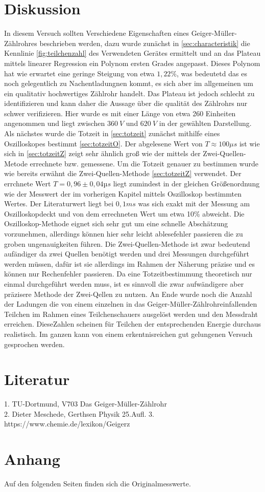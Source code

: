 \section{Diskussion}
\label{sec:diskussion}
In diesem Versuch sollten Verschiedene Eigenschaften eines Geiger-Müller-Zählrohres beschrieben werden, dazu 
wurde zunächst in \autoref{sec:characteristik} die Kennlinie \autoref{fig:teilchenzahl} 
des Verwendeten Gerätes ermittelt und an das Plateau mittels linearer Regression ein Polynom ersten Grades 
angepasst. Dieses Polynom hat wie erwartet eine geringe Steigung von etwa $1,22\%$, was bedeutetd das es noch 
gelegentlich zu Nachentladungnen kommt, es sich aber im allgemeinen um ein qualitativ hochwertiges Zählrohr handelt.
Das Plateau ist jedoch schlecht zu identifizieren und kann daher die Aussage über die qualität des Zählrohrs nur  schwer
verifizieren. Hier wurde es mit einer Länge von etwa 260 Einheiten angenommen und liegt 
zwischen $\SI{360}{V}$ und $\SI{620}{V}$ in der gewählten Darstellung. Als nächstes wurde die Totzeit in 
\autoref{sec:totzeit} zunächst mithilfe eines Oszilloskopes bestimmt \autoref{sec:totzeitO}. 
Der abgelesene Wert von $T\approx 100\mu s$ ist wie sich in \autoref{sec:totzeitZ} zeigt sehr ähnlich groß wie
der mittels der Zwei-Quellen-Metode errechnete bzw. gemessene. Um die Totzeit genauer zu bestimmen wurde wie 
bereits erwähnt die Zwei-Quellen-Methode \autoref{sec:totzeitZ} verwendet. Der errchnete Wert $T=0,96\pm0,04µs$
liegt zumindest in der gleichen Größenordnung wie der Messwert der im vorherigen Kapitel mittels Oszilloskop 
bestimmten Wertes. Der Literaturwert liegt bei $0,1ms$ was sich exakt mit der Messung am Oszilloskopdeckt und
von dem errechneten Wert um etwa 10\% abweicht. Die Oszilloskop-Methode eignet sich sehr gut um eine schnelle 
Abschätzung vorzunehmen, allerdings können hier sehr leicht ablesefehler passieren die zu groben ungenauigkeiten
führen. Die Zwei-Quellen-Methode ist zwar bedeutend aufändiger da zwei Quellen benötigt werden und drei Messungen 
durchgeführt werden müssen, dafür ist sie allerdings im Rahmen der Näherung präzise und es können nur Rechenfehler 
passieren. Da eine Totzeitbestimmung theoretisch nur einmal durchgeführt werden muss, ist es sinnvoll die zwar 
aufwändigere aber präzisere Methode der Zwei-Qellen zu nutzen.  An Ende wurde noch die Anzahl der Ladungen die 
von einem einzelnen in das Geiger-Müller-Zählrohreinfallenden Teilchen im Rahmen eines Teilchenschauers 
ausgelöst werden und den Messdraht erreichen. DieseZahlen scheinen für Teilchen der entsprechenden Energie 
durchaus realistisch. Im ganzen kann von einem erkentnisreichen gut gelungenen Versuch gesprochen werden.

\section{Literatur}
\label{sec:literatur}
1. TU-Dortmund, V703 Das Geiger-Müller-Zählrohr\\
2. Dieter Meschede, Gerthsen Physik 25.Aufl.
3. https://www.chemie.de/lexikon/Geigerz%

\section{Anhang}
\label{sec:anhang}
Auf den folgenden Seiten finden sich die Originalmesswerte.